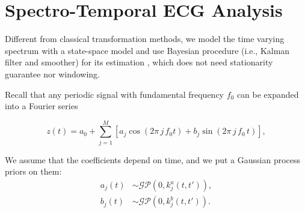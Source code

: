 \documentclass[portrait,a0,final]{a0poster} %
\newcommand{\sectionspace}{10mm} %
\begin{document}
\begin{minipage}{0.98\linewidth}
\begin{minipage}[t]{0.47\linewidth}
\vspace{\sectionspace}
\section{Spectro-Temporal ECG Analysis}

Different from classical transformation methods, we model the time varying spectrum with a state-space model and use Bayesian procedure (i.e., Kalman filter and smoother) for its estimation \cite{qi2002bayesian}, which does not need stationarity guarantee nor windowing. 

Recall that any periodic signal with fundamental frequency $f_0$ can be expanded into a Fourier series

\begin{equation}
z(t) = a_0 + \sum_{j=1}^{M} \left[ a_{j} \cos(2\pi \, j \, f_0 t) + b_{j} \sin(2\pi  \, j \, f_0 \, t) \right],
\label{equ:fourier_series}
\end{equation}

We assume that the coefficients depend on time, and we put a Gaussian process priors on them:
%
\begin{equation}
\begin{split}
a_j(t) &\sim \mathcal{GP}(0,k^a_j(t,t')), \\
b_j(t) &\sim \mathcal{GP}(0,k^b_j(t,t')).
\end{split}
\end{equation}


\end{minipage}
\end{minipage}
\end{document}

